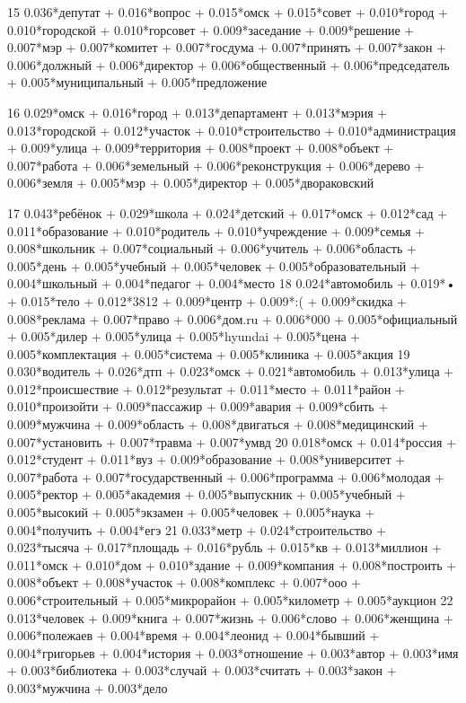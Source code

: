 15 0.036*депутат + 0.016*вопрос + 0.015*омск + 0.015*совет + 0.010*город + 0.010*городской + 0.010*горсовет + 0.009*заседание + 0.009*решение + 0.007*мэр + 0.007*комитет + 0.007*госдума + 0.007*принять + 0.007*закон + 0.006*должный + 0.006*директор + 0.006*общественный + 0.006*председатель + 0.005*муниципальный + 0.005*предложение

16 0.029*омск + 0.016*город + 0.013*департамент + 0.013*мэрия + 0.013*городской + 0.012*участок + 0.010*строительство + 0.010*администрация + 0.009*улица + 0.009*территория + 0.008*проект + 0.008*объект + 0.007*работа + 0.006*земельный + 0.006*реконструкция + 0.006*дерево + 0.006*земля + 0.005*мэр + 0.005*директор + 0.005*двораковский

17 0.043*ребёнок + 0.029*школа + 0.024*детский + 0.017*омск + 0.012*сад + 0.011*образование + 0.010*родитель + 0.010*учреждение + 0.009*семья + 0.008*школьник + 0.007*социальный + 0.006*учитель + 0.006*область + 0.005*день + 0.005*учебный + 0.005*человек + 0.005*образовательный + 0.004*школьный + 0.004*педагог + 0.004*место
18 0.024*автомобиль + 0.019*• + 0.015*тело + 0.012*3812 + 0.009*центр + 0.009*:( + 0.009*скидка + 0.008*реклама + 0.007*право + 0.006*дом.ru + 0.006*000 + 0.005*официальный + 0.005*дилер + 0.005*улица + 0.005*hyundai + 0.005*цена + 0.005*комплектация + 0.005*система + 0.005*клиника + 0.005*акция
19 0.030*водитель + 0.026*дтп + 0.023*омск + 0.021*автомобиль + 0.013*улица + 0.012*происшествие + 0.012*результат + 0.011*место + 0.011*район + 0.010*произойти + 0.009*пассажир + 0.009*авария + 0.009*сбить + 0.009*мужчина + 0.009*область + 0.008*двигаться + 0.008*медицинский + 0.007*установить + 0.007*травма + 0.007*умвд
20 0.018*омск + 0.014*россия + 0.012*студент + 0.011*вуз + 0.009*образование + 0.008*университет + 0.007*работа + 0.007*государственный + 0.006*программа + 0.006*молодая + 0.005*ректор + 0.005*академия + 0.005*выпускник + 0.005*учебный + 0.005*высокий + 0.005*экзамен + 0.005*человек + 0.005*наука + 0.004*получить + 0.004*егэ
21 0.033*метр + 0.024*строительство + 0.023*тысяча + 0.017*площадь + 0.016*рубль + 0.015*кв + 0.013*миллион + 0.011*омск + 0.010*дом + 0.010*здание + 0.009*компания + 0.008*построить + 0.008*объект + 0.008*участок + 0.008*комплекс + 0.007*ооо + 0.006*строительный + 0.005*микрорайон + 0.005*километр + 0.005*аукцион
22 0.013*человек + 0.009*книга + 0.007*жизнь + 0.006*слово + 0.006*женщина + 0.006*полежаев + 0.004*время + 0.004*леонид + 0.004*бывший + 0.004*григорьев + 0.004*история + 0.003*отношение + 0.003*автор + 0.003*имя + 0.003*библиотека + 0.003*случай + 0.003*считать + 0.003*закон + 0.003*мужчина + 0.003*дело
